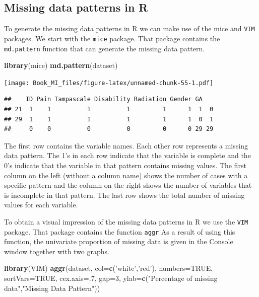 \documentclass[]{book}
\newenvironment{Shaded}{\begin{snugshade}}{\end{snugshade}}
\newcommand{\KeywordTok}[1]{\textcolor[rgb]{0.13,0.29,0.53}{\textbf{#1}}}
\newcommand{\DataTypeTok}[1]{\textcolor[rgb]{0.13,0.29,0.53}{#1}}
\newcommand{\DecValTok}[1]{\textcolor[rgb]{0.00,0.00,0.81}{#1}}
\newcommand{\StringTok}[1]{\textcolor[rgb]{0.31,0.60,0.02}{#1}}
\newcommand{\OtherTok}[1]{\textcolor[rgb]{0.56,0.35,0.01}{#1}}
\newcommand{\NormalTok}[1]{#1}
\begin{document}
\subsection{Missing data patterns in
R}\label{missing-data-patterns-in-r}

To generate the missing data patterns in R we can make use of the mice
and \texttt{VIM} packages. We start with the \texttt{mice} package. That
package contains the \texttt{md.pattern} function that can generate the
missing data pattern.

\begin{Shaded}
\begin{Highlighting}[]
\KeywordTok{library}\NormalTok{(mice)}
\KeywordTok{md.pattern}\NormalTok{(dataset)}
\end{Highlighting}
\end{Shaded}

\texttt{[image: Book\_MI\_files/figure-latex/unnamed-chunk-55-1.pdf]}

\begin{verbatim}
##    ID Pain Tampascale Disability Radiation Gender GA   
## 21  1    1          1          1         1      1  1  0
## 29  1    1          1          1         1      1  0  1
##     0    0          0          0         0      0 29 29
\end{verbatim}

The first row contains the variable names. Each other row represents a
missing data pattern. The 1's in each row indicate that the variable is
complete and the 0's indicate that the variable in that pattern contains
missing values. The first column on the left (without a column name)
shows the number of cases with a specific pattern and the column on the
right shows the number of variables that is incomplete in that pattern.
The last row shows the total number of missing values for each variable.

To obtain a visual impression of the missing data patterns in R we use
the \texttt{VIM} package. That package contains the function
\texttt{aggr} As a result of using this function, the univariate
proportion of missing data is given in the Console window together with
two graphs.

\begin{Shaded}
\begin{Highlighting}[]
\KeywordTok{library}\NormalTok{(VIM)}
\KeywordTok{aggr}\NormalTok{(dataset, }\DataTypeTok{col=}\KeywordTok{c}\NormalTok{(}\StringTok{'white'}\NormalTok{,}\StringTok{'red'}\NormalTok{), }\DataTypeTok{numbers=}\OtherTok{TRUE}\NormalTok{, }\DataTypeTok{sortVars=}\OtherTok{TRUE}\NormalTok{, }\DataTypeTok{cex.axis=}\NormalTok{.}\DecValTok{7}\NormalTok{, }\DataTypeTok{gap=}\DecValTok{3}\NormalTok{, }\DataTypeTok{ylab=}\KeywordTok{c}\NormalTok{(}\StringTok{"Percentage of missing data"}\NormalTok{,}\StringTok{"Missing Data Pattern"}\NormalTok{))}
\end{Highlighting}
\end{Shaded}
\end{document}
